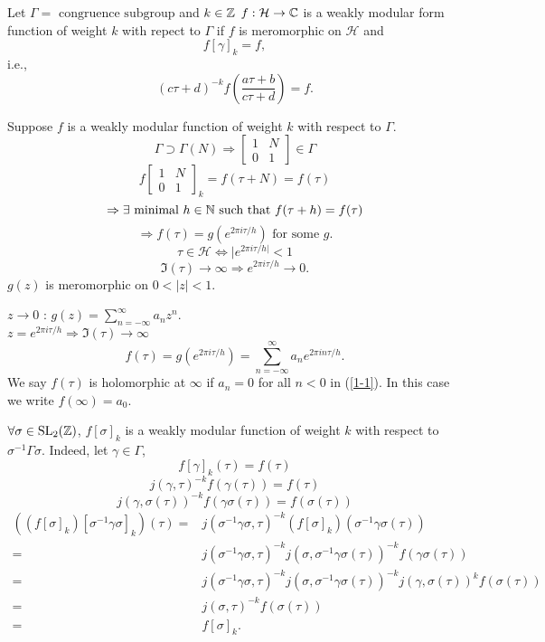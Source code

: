 \begin{definition}
  Let $\Gamma= \text{ congruence subgroup}$ and $k\in \mathbb{Z}$ $f:\mathcal{H}\to \mathbb{C}$ is a weakly modular form function of weight $k$ with repect to $\Gamma$ if $f$ is meromorphic on $\mathcal{H}$ and 
  \[
    f[\gamma]_k=f,
  \] 
  i.e.,
  \[
    (c\tau+d)^{-k}f\left( \frac{a\tau+b}{c\tau+d} \right) = f.
  \] 
\end{definition}
Suppose $f$ is a weakly modular function of weight $k$ with respect to $\Gamma$. 
 \[
   \Gamma \supset \Gamma(N)\Rightarrow \begin{bmatrix} 1&N\\0&1 \end{bmatrix} \in \Gamma 
\] 
\[
  f\begin{bmatrix} 1&N\\0&1 \end{bmatrix} _{k}=f(\tau+N)=f(\tau)
\]
\[
  \Rightarrow \exists \text{ minimal } h\in \mathbb{N} \text{ such that } f(\tau+h)=f(\tau)
\]
\[
  \Rightarrow f(\tau)=g( e^{2\pi i\tau /h}) \text{ for some }g.  
\] 
\[
\tau \in \mathcal{H}\Leftrightarrow  |e^{2\pi i \tau/h|}<1
\] 
\[
  \Im(\tau)\to \infty \Rightarrow e^{2\pi i\tau /h}\to 0.
\] 
$g(z)$ is meromorphic on $0<|z|<1$.

$z\to 0$ : $g(z)=\sum_{n=-\infty}^{\infty} a_n z^n$.\\
$z=e^{2\pi i \tau /h}\Rightarrow \Im(\tau)\to \infty$
\begin{equation}\label{1-1}
  f(\tau)=g(e^{2\pi i\tau/ h})=\sum_{n=-\infty}^{\infty} a_n e^{2\pi in\tau /h}.
\end{equation}
We say $f(\tau)$ is holomorphic at $\infty$ if $a_n=0$ for all $n<0$ in (\ref{1-1}). In this case we write $f(\infty)=a_0$.

$\forall \sigma \in \operatorname{SL}_2(\mathbb{Z})$, $f[\sigma]_k$ is a weakly modular function of weight $k$ with respect to $\sigma^{-1}\Gamma\sigma$. Indeed, let $\gamma \in \Gamma$,
\[
  f[\gamma]_k(\tau)=f(\tau)
\] 
\[
  j(\gamma,\tau)^{-k}f(\gamma(\tau))=f(\tau)
\] 
\[
  j(\gamma,\sigma(\tau))^{-k}f(\gamma\sigma(\tau))=f(\sigma(\tau))
\] 
\begin{align*}
  ((f[\sigma]_k)[\sigma^{-1}\gamma\sigma]_k)(\tau)=&j(\sigma^{-1}\gamma\sigma,\tau)^{-k}(f[\sigma]_k)(\sigma^{-1}\gamma\sigma(\tau))\\
  =& j(\sigma^{-1}\gamma\sigma,\tau)^{-k}j(\sigma,\sigma^{-1}\gamma\sigma(\tau))^{-k}f\left(\gamma\sigma(\tau)  \right) \\
  =& j(\sigma^{-1}\gamma\sigma,\tau)^{-k}j(\sigma,\sigma^{-1}\gamma\sigma(\tau))^{-k}j(\gamma,\sigma(\tau))^{k}f(\sigma(\tau))\\
  = & j(\sigma,\tau)^{-k}f(\sigma(\tau))\\
  =& f[\sigma]_k
.\end{align*}

